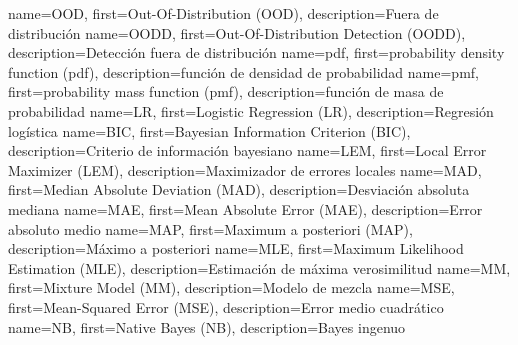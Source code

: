   {name={OOD},        first={Out-Of-Distribution (OOD)},                  description={Fuera de distribución}}
 {name={OODD},       first={Out-Of-Distribution Detection (OODD)},       description={Detección fuera de distribución}}
  {name={pdf},        first={probability density function (pdf)},         description={función de densidad de probabilidad}}
  {name={pmf},        first={probability mass function (pmf)},            description={función de masa de probabilidad}}
   {name={LR},         first={Logistic Regression (LR)},                   description={Regresión logística}}
  {name={BIC},        first={Bayesian Information Criterion (BIC)},       description={Criterio de información bayesiano}}
  {name={LEM},        first={Local Error Maximizer (LEM)},                description={Maximizador de errores locales}}
  {name={MAD},        first={Median Absolute Deviation (MAD)},            description={Desviación absoluta mediana}}
  {name={MAE},        first={Mean Absolute Error (MAE)},                  description={Error absoluto medio}}
  {name={MAP},        first={Maximum a posteriori (MAP)},                 description={Máximo a posteriori}}
  {name={MLE},        first={Maximum Likelihood Estimation (MLE)},        description={Estimación de máxima verosimilitud}}
   {name={MM},         first={Mixture Model (MM)},                         description={Modelo de mezcla}}
  {name={MSE},        first={Mean-Squared Error (MSE)},                   description={Error medio cuadrático}}
   {name={NB},         first={Native Bayes (NB)},                          description={Bayes ingenuo}}


